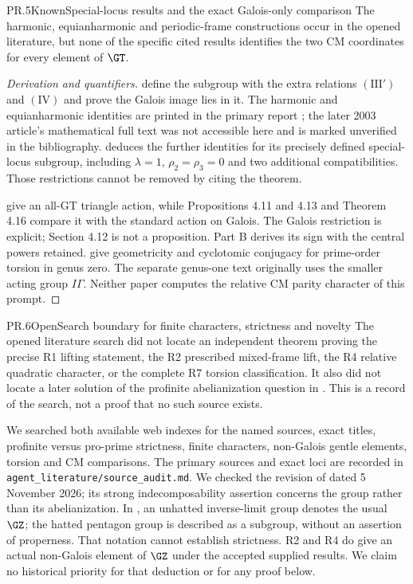\begin{statement}{PR.5}{Known}{Special-locus results and the exact Galois-only comparison}
The harmonic, equianharmonic and periodic-frame constructions occur
in the opened literature, but none of the specific cited results
identifies the two CM coordinates for every element of $\GT$.
\end{statement}
\begin{proof}[Derivation and quantifiers]
\citet[Theorems 1.1--1.2]{LitNakamuraSchneps2000} define the subgroup
with the extra relations $(\mathrm{III}')$ and $(\mathrm{IV})$ and
prove the Galois image lies in it. The harmonic and equianharmonic
identities are printed in the primary report
\citet[Theorems 1--2]{LitTsunogaiNakamura2002}; the later 2003
article's mathematical full text was not accessible here and is marked
unverified in the bibliography. \citet[Theorem 3.4]{LitSchneps2006}
deduces the further identities for its precisely defined special-locus
subgroup, including $\lambda=1$, $\rho_2=\rho_3=0$ and two additional
compatibilities. Those restrictions cannot be removed by citing the
theorem.

\citet[Proposition 4.4]{LitNakamuraTsunogaiYasuda2010} give an
all-GT triangle action, while Propositions 4.11 and 4.13 and
Theorem 4.16 compare it with the standard action on Galois. The
Galois restriction is explicit; Section 4.12 is not a proposition.
Part B derives its sign with the central powers retained.
\citet[Theorems A and B]{Collas2012GenusZero} give geometricity and
cyclotomic conjugacy for prime-order torsion in genus zero. The
separate genus-one text \citep{CollasGenusOneAuthorText} originally
uses the smaller acting group $I\Gamma$. Neither paper computes the
relative CM parity character of this prompt.
\end{proof}

\begin{statement}{PR.6}{Open}{Search boundary for finite characters, strictness and novelty}
The opened literature search did not locate an independent theorem
proving the precise R1 lifting statement, the R2 prescribed mixed-frame
lift, the R4 relative quadratic character, or the complete R7 torsion
classification. It also did not locate a later solution of the profinite
abelianization question in \citet[Question 1.2]{LitLochakSchnepsOpenProblems}.
This is a record of the search, not a proof that no such source exists.
\end{statement}
We searched both available web indexes for the named sources, exact
titles, profinite versus pro-prime strictness, finite characters,
non-Galois gentle elements, torsion and CM comparisons. The primary
sources and exact loci are recorded in
\texttt{agent\_literature/source\_audit.md}. We checked the revision
of \citet{LitCollas2026v2} dated 5 November 2026; its strong
indecomposability assertion concerns the group rather than its
abelianization. In \citet[Proposition 5.20 and closing remarks,
p.373]{LitGuillot2014}, an unhatted inverse-limit group denotes the
usual $\GZ$; the hatted pentagon group is described as a subgroup,
without an assertion of properness. That notation cannot establish
strictness. R2 and R4 do give an actual non-Galois element of $\GZ$
under the accepted supplied results. We claim no historical priority
for that deduction or for any proof below.
